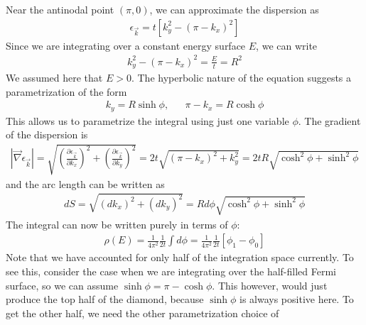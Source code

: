\documentclass[12pt]{article}
\numberwithin{equation}{section}
\begin{document}
Near the antinodal point \(\left(\pi, 0\right) \), we can approximate the dispersion as
\begin{equation}\begin{aligned}
	\epsilon_{\vec k} = t\left[k_y^2 - \left( \pi - k_x \right) ^2\right] 
\end{aligned}\end{equation}
Since we are integrating over a constant energy surface \(E \), we can write
\begin{equation}\begin{aligned}
	k_y^2 - \left( \pi - k_x \right)^2 = \frac{E}{t} = R^2
\end{aligned}\end{equation}
We assumed here that \(E > 0\). The hyperbolic nature of the equation suggests a parametrization of the form
\begin{equation}\begin{aligned}
	k_y = R\sinh \phi, &&\pi - k_x = R\cosh \phi
\end{aligned}\end{equation}
This allows us to parametrize the integral using just one variable \(\phi\). The gradient of the dispersion is
\begin{equation}\begin{aligned}
	|\vec \nabla \epsilon_{\vec{k}}| = \sqrt{\left(\frac{\partial{\epsilon_{\vec k}}}{\partial{k_x}}\right)^2 + \left(\frac{\partial{\epsilon_{\vec k}}}{\partial{k_y}}\right)^2} = 2t\sqrt{\left(\pi - k_x\right)^2 + k_y^2} = 2tR\sqrt{\cosh^2\phi + \sinh^2\phi}
\end{aligned}\end{equation}
and the arc length can be written as
\begin{equation}\begin{aligned}
	dS = \sqrt{(dk_x)^2 + (dk_y)^2} = Rd\phi\sqrt{\cosh^2\phi + \sinh^2\phi}
\end{aligned}\end{equation}
The integral can now be written purely in terms of \(\phi\):
\begin{equation}\begin{aligned}
	\rho(E) = \frac{1}{4\pi^2}\frac{1}{2t}\int d\phi = \frac{1}{4\pi^2}\frac{1}{2t}\left[\phi_1 - \phi_0\right] 
\end{aligned}\end{equation}
Note that we have accounted for only half of the integration space currently. To see this, consider the case when we are integrating over the half-filled Fermi surface, so we can assume \(\sinh \phi = \pi - \cosh \phi\). This however, would just produce the top half of the diamond, because \(\sinh \phi\) is always positive here. To get the other half, we need the other parametrization choice of 
\end{document}
